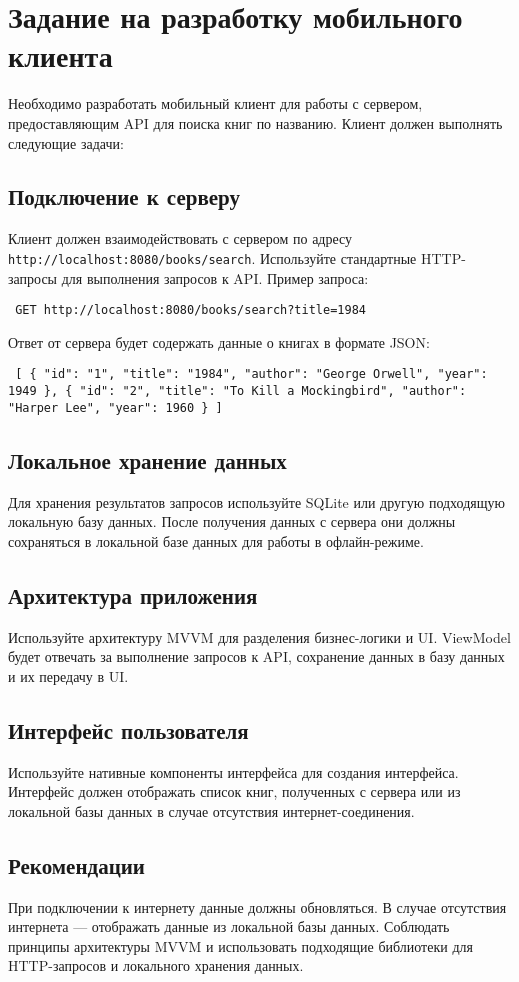 \section{Задание на разработку мобильного клиента}

Необходимо разработать мобильный клиент для работы с сервером, предоставляющим API для поиска книг по названию. Клиент должен выполнять следующие задачи:

\subsection{Подключение к серверу} Клиент должен взаимодействовать с сервером по адресу \texttt{http://localhost:8080/books/search}. Используйте стандартные HTTP-запросы для выполнения запросов к API. Пример запроса:

\begin{verbatim} GET http://localhost:8080/books/search?title=1984 \end{verbatim}

Ответ от сервера будет содержать данные о книгах в формате JSON:

\begin{verbatim} [ { "id": "1", "title": "1984", "author": "George Orwell", "year": 1949 }, { "id": "2", "title": "To Kill a Mockingbird", "author": "Harper Lee", "year": 1960 } ] \end{verbatim}

\subsection{Локальное хранение данных} Для хранения результатов запросов используйте SQLite или другую подходящую локальную базу данных. После получения данных с сервера они должны сохраняться в локальной базе данных для работы в офлайн-режиме.

\subsection{Архитектура приложения} Используйте архитектуру MVVM для разделения бизнес-логики и UI. ViewModel будет отвечать за выполнение запросов к API, сохранение данных в базу данных и их передачу в UI.

\subsection{Интерфейс пользователя} Используйте нативные компоненты интерфейса для создания интерфейса. Интерфейс должен отображать список книг, полученных с сервера или из локальной базы данных в случае отсутствия интернет-соединения.

\subsection{Рекомендации}

При подключении к интернету данные должны обновляться.
В случае отсутствия интернета — отображать данные из локальной базы данных.
Соблюдать принципы архитектуры MVVM и использовать подходящие библиотеки для HTTP-запросов и локального хранения данных.
